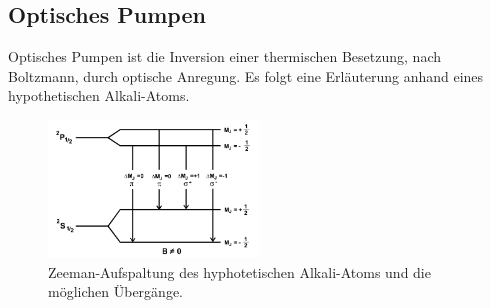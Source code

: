 \subsection{Optisches Pumpen}
Optisches Pumpen ist die Inversion einer thermischen Besetzung, nach Boltzmann, durch optische Anregung.
Es folgt eine Erläuterung anhand eines hypothetischen Alkali-Atoms.
\begin{figure}
    \centering
    \includegraphics[width=0.5\textwidth]{Uebergang.PNG}
    \caption{Zeeman-Aufspaltung des hyphotetischen Alkali-Atoms und die möglichen Übergänge.\cite{skript}}
    \label{fig:Uebargang}
\end{figure}

